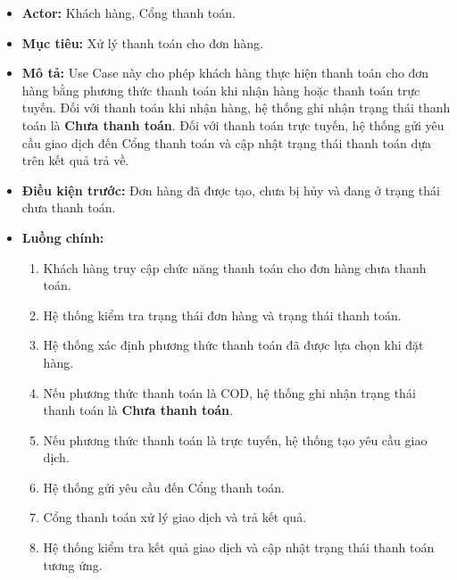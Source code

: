 \documentclass[12pt,a4paper]{article}
\begin{document}
\begin{itemize}

 \item \textbf{Actor:} Khách hàng, Cổng thanh toán.

 \item \textbf{Mục tiêu:} Xử lý thanh toán cho đơn hàng.

 \item \textbf{Mô tả:} Use Case này cho phép khách hàng thực hiện thanh toán cho đơn hàng bằng phương thức thanh toán khi nhận hàng hoặc thanh toán trực tuyến. Đối với thanh toán khi nhận hàng, hệ thống ghi nhận trạng thái thanh toán là \textbf{Chưa thanh toán}. Đối với thanh toán trực tuyến, hệ thống gửi yêu cầu giao dịch đến Cổng thanh toán và cập nhật trạng thái thanh toán dựa trên kết quả trả về.

 \item \textbf{Điều kiện trước:} Đơn hàng đã được tạo, chưa bị hủy và đang ở trạng thái chưa thanh toán.

\item \textbf{Luồng chính:}

\begin{enumerate}

    \item Khách hàng truy cập chức năng thanh toán cho đơn hàng chưa thanh toán.

    \item Hệ thống kiểm tra trạng thái đơn hàng và trạng thái thanh toán.

    \item Hệ thống xác định phương thức thanh toán đã được lựa chọn khi đặt hàng.

    \item Nếu phương thức thanh toán là COD, hệ thống ghi nhận trạng thái thanh toán là \textbf{Chưa thanh toán}.

    \item Nếu phương thức thanh toán là trực tuyến, hệ thống tạo yêu cầu giao dịch.

    \item Hệ thống gửi yêu cầu đến Cổng thanh toán.

    \item Cổng thanh toán xử lý giao dịch và trả kết quả.

    \item Hệ thống kiểm tra kết quả giao dịch và cập nhật trạng thái thanh toán tương ứng.

\end{enumerate}


\end{itemize}
\end{document}
